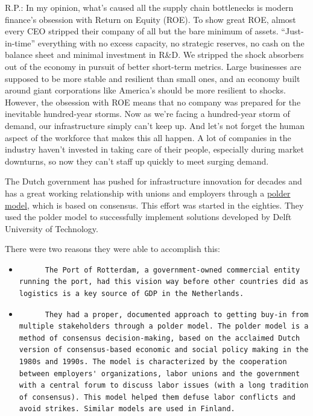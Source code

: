 \documentclass[
]{book}
\begin{document}
R.P.: In my opinion, what's caused all the supply chain bottlenecks is modern finance's obsession with Return on Equity (ROE). To show great ROE, almost every CEO stripped their company of all but the bare minimum of assets. ``Just-in-time'' everything with no excess capacity, no strategic reserves, no cash on the balance sheet and minimal investment in R\&D.
We stripped the shock absorbers out of the economy in pursuit of better short-term metrics.
Large businesses are supposed to be more stable and resilient than small ones, and an economy built around giant corporations like America's should be more resilient to shocks. However, the obsession with ROE means that no company was prepared for the inevitable hundred-year storms. Now as we're facing a hundred-year storm of demand, our infrastructure simply can't keep up.
And let's not forget the human aspect of the workforce that makes this all happen. A lot of companies in the industry haven't invested in taking care of their people, especially during market downturns, so now they can't staff up quickly to meet surging demand.

The Dutch government has pushed for infrastructure innovation for decades and has a great working relationship with unions and employers through a \href{https://en.wikipedia.org/wiki/Polder_model}{polder model}, which is based on consensus. This effort was started in the eighties. They used the polder model to successfully implement solutions developed by Delft University of Technology.

There were two reasons they were able to accomplish this:

\begin{itemize}
\item
\begin{verbatim}
      The Port of Rotterdam, a government-owned commercial entity running the port, had this vision way before other countries did as logistics is a key source of GDP in the Netherlands.
\end{verbatim}
\item
\begin{verbatim}
      They had a proper, documented approach to getting buy-in from multiple stakeholders through a polder model. The polder model is a method of consensus decision-making, based on the acclaimed Dutch version of consensus-based economic and social policy making in the 1980s and 1990s. The model is characterized by the cooperation between employers' organizations, labor unions and the government with a central forum to discuss labor issues (with a long tradition of consensus). This model helped them defuse labor conflicts and avoid strikes. Similar models are used in Finland.
\end{verbatim}
\end{itemize}
\end{document}
